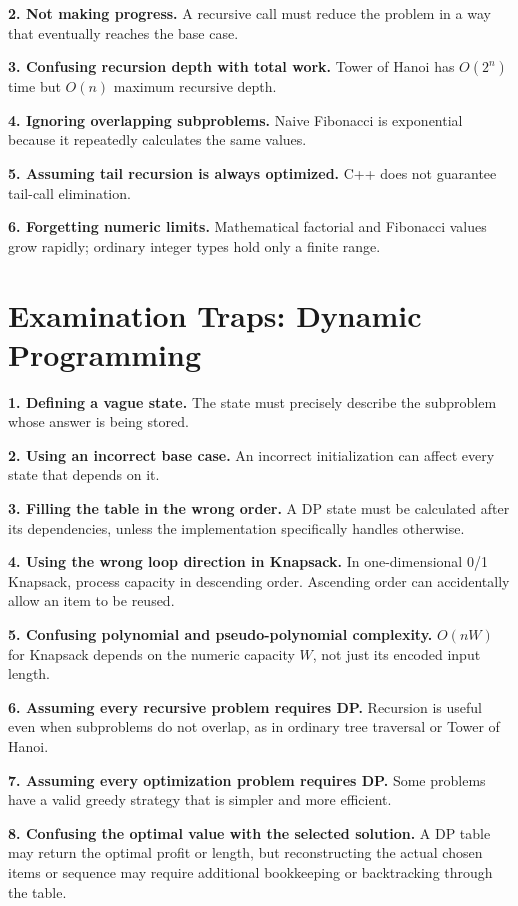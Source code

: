 \textbf{2. Not making progress.} A recursive call must reduce the problem in a way that eventually reaches the base case.

\textbf{3. Confusing recursion depth with total work.} Tower of Hanoi has $O(2^n)$ time but $O(n)$ maximum recursive depth.

\textbf{4. Ignoring overlapping subproblems.} Naive Fibonacci is exponential because it repeatedly calculates the same values.

\textbf{5. Assuming tail recursion is always optimized.} C++ does not guarantee tail-call elimination.

\textbf{6. Forgetting numeric limits.} Mathematical factorial and Fibonacci values grow rapidly; ordinary integer types hold only a finite range.

\section{Examination Traps: Dynamic Programming}

\textbf{1. Defining a vague state.} The state must precisely describe the subproblem whose answer is being stored.

\textbf{2. Using an incorrect base case.} An incorrect initialization can affect every state that depends on it.

\textbf{3. Filling the table in the wrong order.} A DP state must be calculated after its dependencies, unless the implementation specifically handles otherwise.

\textbf{4. Using the wrong loop direction in Knapsack.} In one-dimensional 0/1 Knapsack, process capacity in descending order. Ascending order can accidentally allow an item to be reused.

\textbf{5. Confusing polynomial and pseudo-polynomial complexity.} $O(nW)$ for Knapsack depends on the numeric capacity $W$, not just its encoded input length.

\textbf{6. Assuming every recursive problem requires DP.} Recursion is useful even when subproblems do not overlap, as in ordinary tree traversal or Tower of Hanoi.

\textbf{7. Assuming every optimization problem requires DP.} Some problems have a valid greedy strategy that is simpler and more efficient.

\textbf{8. Confusing the optimal value with the selected solution.} A DP table may return the optimal profit or length, but reconstructing the actual chosen items or sequence may require additional bookkeeping or backtracking through the table.


